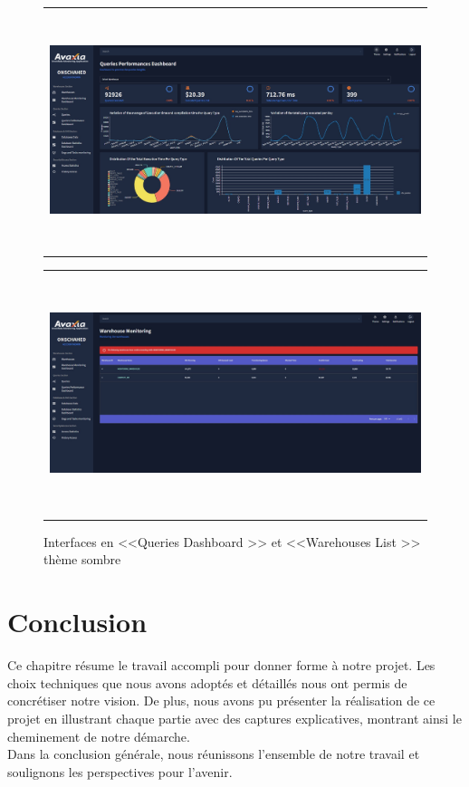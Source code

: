  \begin{figure}[H]
    \centering
    \begin{tabular}[b]{c}
        \includegraphics[width=1\linewidth ,height=7cm]{img/captures/dark/1.jpg}
        \end{tabular}
        \begin{tabular}[b]{c}
            \includegraphics[width=1\linewidth,height=7cm]{img/captures/dark/3.jpg}
            \end{tabular}
            \caption{Interfaces en <<Queries Dashboard >> et <<Warehouses List >> thème sombre}
            \label{fig:dark2}
\end{figure}


\section*{Conclusion}
Ce chapitre résume le travail accompli pour donner forme à notre projet. Les choix techniques que nous avons adoptés et détaillés nous ont permis de concrétiser notre vision. De plus, nous avons pu présenter la réalisation de ce projet en illustrant chaque partie avec des captures explicatives, montrant ainsi le cheminement de notre démarche. 
\\Dans la conclusion générale, nous réunissons l'ensemble de notre travail et soulignons les perspectives pour l'avenir. 